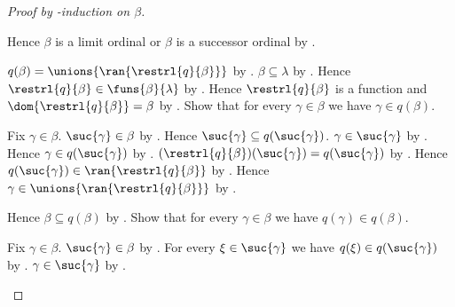 \begin{proof}[Proof by \in-induction on $\beta$]
\begin{byCase}
            Hence $\beta$ is a limit ordinal or
                $\beta$ is a successor ordinal by
                .
            \begin{byCase}
                    $q(\beta)=\unions{\ran{\restrl{q}{\beta}}}$ by
                        .
                    $\beta\subseteq\lambda$ by
                        .
                    Hence $\restrl{q}{\beta}\in\funs{\beta}{\lambda}$ by
                        .
                    Hence $\restrl{q}{\beta}$ is a function and
                        $\dom{\restrl{q}{\beta}}=\beta$ by
                        .
                    Show that for every $\gamma\in\beta$ we have
                        $\gamma\in q(\beta)$.
                    \begin{subproof}
                        Fix $\gamma\in\beta$.
                        $\suc{\gamma}\in\beta$ by
                            .
                        Hence $\suc{\gamma}\subseteq q(\suc{\gamma})$.
                        $\gamma\in\suc{\gamma}$ by .
                        Hence $\gamma\in q(\suc{\gamma})$ by
                            .
                        $(\restrl{q}{\beta})(\suc{\gamma})
                            =q(\suc{\gamma})$ by
                            .
                        Hence $q(\suc{\gamma})
                            \in\ran{\restrl{q}{\beta}}$ by
                            .
                        Hence $\gamma\in
                            \unions{\ran{\restrl{q}{\beta}}}$ by
                            .
                    \end{subproof}
                    Hence $\beta\subseteq q(\beta)$ by .
                    Show that for every $\gamma\in\beta$ we have
                        $q(\gamma)\in q(\beta)$.
                    \begin{subproof}
                        Fix $\gamma\in\beta$.
                        $\suc{\gamma}\in\beta$ by
                            .
                        For every $\xi\in\suc{\gamma}$ we have
                            $q(\xi)\in q(\suc{\gamma})$ by \auto.
                        $\gamma\in\suc{\gamma}$ by .

\end{subproof}
\end{byCase}
\end{byCase}
\end{proof}

